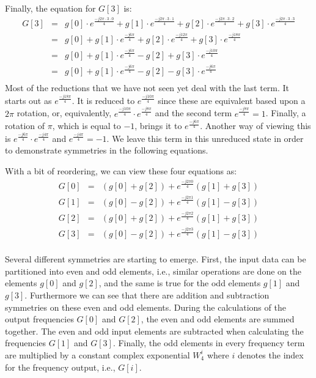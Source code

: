Finally, the equation for $G[3]$ is:
\begin{equation}
\begin{array} {lll} 
G[3] & = & g[0] \cdot e^{\frac{-j 2 \pi \cdot 3 \cdot 0}{4}} + g[1] \cdot e^{\frac{-j 2 \pi \cdot 3 \cdot 1}{4}} + g[2] \cdot e^{\frac{-j 2 \pi \cdot 3 \cdot 2}{4}} + g[3] \cdot e^{\frac{-j 2 \pi \cdot 3 \cdot 3}{4}}\\
 & = & g[0] + g[1] \cdot e^{\frac{-j  6 \pi}{4}} + g[2] \cdot e^{\frac{-j  12 \pi}{4}} + g[3] \cdot e^{\frac{-j 18 \pi}{4}}\\
 & = & g[0] + g[1] \cdot e^{\frac{-j 6  \pi }{4}}  - g[2] +  g[3] \cdot e^{\frac{-j 10  \pi}{4}}\\
  & = & g[0] + g[1] \cdot e^{\frac{-j 6  \pi }{4}}  - g[2] -  g[3] \cdot e^{\frac{-j 6  \pi}{4}}\\
\end{array} 
\end{equation} Most of the reductions that we have not seen yet deal with the last term. It starts out as $e^{\frac{-j 18 \pi}{4}}$. It is reduced to $e^{\frac{-j 10 \pi}{4}}$ since these are equivalent based upon a $2 \pi$ rotation, or, equivalently, $e^{\frac{-j 10 \pi}{4}} \cdot e^{\frac{-j 8 \pi}{4}}$ and the second term $e^{\frac{-j 8 \pi}{4}} = 1$. Finally, a rotation of $\pi$, which is equal to $-1$, brings it to $e^{\frac{-j 6  \pi}{4}}$. Another way of viewing this is $e^{\frac{-j 6 \pi}{4}} \cdot e^{\frac{-j 4 \pi}{4}}$ and $e^{\frac{-j 4 \pi}{4}} = -1$. We leave this term in this unreduced state in order to demonstrate symmetries in the following equations.

With a bit of reordering, we can view these four equations as:
\begin{equation}
\begin{array} {lll} 
G[0] & = & (g[0] + g[2]) + e^{\frac{-j 2 \pi 0}{4}} (g[1] + g[3])\\
G[1] & = & (g[0] - g[2]) + e^{\frac{-j 2 \pi 1}{4}} (g[1] - g[3])\\
G[2] & = & (g[0] + g[2]) + e^{\frac{-j 2 \pi 2}{4}} (g[1] + g[3])\\
G[3] & = & (g[0] - g[2]) + e^{\frac{-j 2 \pi 3}{4}} (g[1] - g[3])\\
\end{array}
\end{equation}

Several different symmetries are starting to emerge. First, the input data can be partitioned into even and odd elements, i.e., similar operations are done on the elements $g[0]$ and $g[2]$, and the same is true for the odd elements $g[1]$ and $g[3]$. Furthermore we can see that there are addition and subtraction symmetries on these even and odd elements. During the calculations of the output frequencies $G[0]$ and $G[2]$, the even and odd elements are summed together. The even and odd input elements are subtracted when calculating the frequencies $G[1]$ and $G[3]$.  Finally, the odd elements in every frequency term are multiplied by a constant complex exponential $W^i_4$ where $i$ denotes the index for the frequency output, i.e., $G[i]$. 

